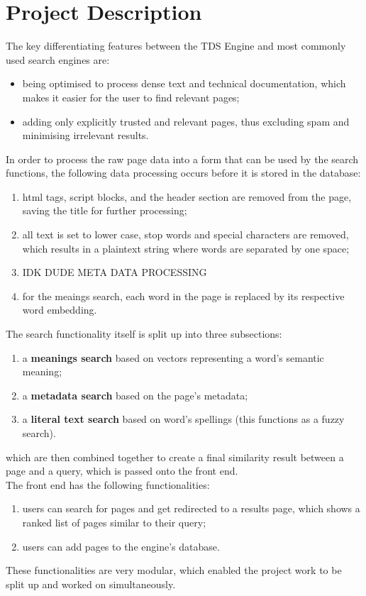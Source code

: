 \section{Project Description}

The key differentiating features between the TDS Engine and most commonly used search engines are:

\begin{itemize}
  \item being optimised to process dense text and technical documentation, which makes it easier for the user to find relevant pages;
  \item adding only explicitly trusted and relevant pages, thus excluding spam and minimising irrelevant results.
\end{itemize}

In order to process the raw page data into a form that can be used by the search functions, the following data processing occurs before it is stored in the database:
\begin{enumerate}
  \item html tags, script blocks, and the header section are removed from the page, saving the title for further processing;
  \item all text is set to lower case, stop words and special characters are removed, which results in a plaintext string where words are separated by one space;
  \item IDK DUDE META DATA PROCESSING
  \item for the meaings search, each word in the page is replaced by its respective word embedding. 
\end{enumerate}

The search functionality itself is split up into three subsections:
\begin{enumerate}
  \item a \textbf{meanings search} based on vectors representing a word's semantic meaning;
  \item a \textbf{metadata search} based on the page's metadata;
  \item a \textbf{literal text search} based on word's spellings (this functions as a fuzzy search).
\end{enumerate}
which are then combined together to create a final similarity result between a page and a query, which is passed onto the front end. \\

The front end has the following functionalities:
\begin{enumerate}
  \item users can search for pages and get redirected to a results page, which shows a ranked list of pages similar to their query;
  \item users can add pages to the engine's database.
\end{enumerate}

These functionalities are very modular, which enabled the project work to be split up and worked on simultaneously.  
